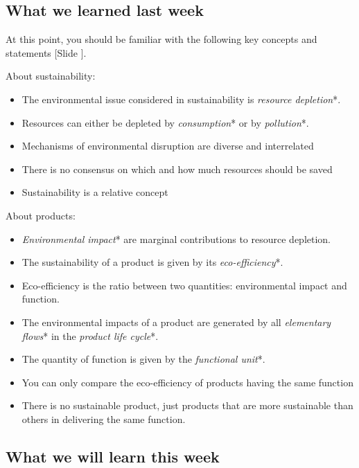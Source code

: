 \documentclass{article}
\newcounter{slide}
\begin{document}
\subsection{What we learned last week}
\label{sec:lastweek}

At this point, you should be familiar with the following key concepts and statements {\color{blue}[Slide ]}.

About sustainability:
\begin{itemize}	
	\item The environmental issue considered in sustainability is \emph{resource depletion}*.
	\item Resources can either be depleted by \emph{consumption}* or by \emph{pollution}*.
	\item Mechanisms of environmental disruption are diverse and interrelated
	\item There is no consensus on which and how much resources should be saved
	\item Sustainability is a relative concept
\end{itemize}

About products:
\begin{itemize}	
	\item \emph{Environmental impact}* are marginal contributions to resource depletion.
	\item The sustainability of a product is given by its \emph{eco-efficiency}*.
	\item Eco-efficiency is the ratio between two quantities: environmental impact and function.
	\item The environmental impacts of a product are generated by all \emph{elementary flows}* in the \emph{product life cycle}*.
	\item The quantity of function is given by the \emph{functional unit}*.
	\item You can only compare the eco-efficiency of products having the same function
	\item There is no sustainable product, just products that are more sustainable than others in delivering the same function.
\end{itemize}

\subsection{What we will learn this week}
\label{sec:thisweek}
\end{document}
